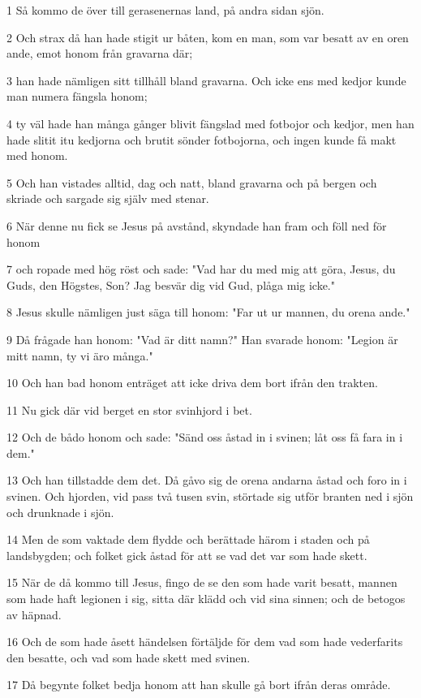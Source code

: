 \par 1 Så kommo de över till gerasenernas land, på andra sidan sjön.
\par 2 Och strax då han hade stigit ur båten, kom en man, som var besatt av en oren ande, emot honom från gravarna där;
\par 3 han hade nämligen sitt tillhåll bland gravarna. Och icke ens med kedjor kunde man numera fängsla honom;
\par 4 ty väl hade han många gånger blivit fängslad med fotbojor och kedjor, men han hade slitit itu kedjorna och brutit sönder fotbojorna, och ingen kunde få makt med honom.
\par 5 Och han vistades alltid, dag och natt, bland gravarna och på bergen och skriade och sargade sig själv med stenar.
\par 6 När denne nu fick se Jesus på avstånd, skyndade han fram och föll ned för honom
\par 7 och ropade med hög röst och sade: "Vad har du med mig att göra, Jesus, du Guds, den Högstes, Son? Jag besvär dig vid Gud, plåga mig icke."
\par 8 Jesus skulle nämligen just säga till honom: "Far ut ur mannen, du orena ande."
\par 9 Då frågade han honom: "Vad är ditt namn?" Han svarade honom: "Legion är mitt namn, ty vi äro många."
\par 10 Och han bad honom enträget att icke driva dem bort ifrån den trakten.
\par 11 Nu gick där vid berget en stor svinhjord i bet.
\par 12 Och de bådo honom och sade: "Sänd oss åstad in i svinen; låt oss få fara in i dem."
\par 13 Och han tillstadde dem det. Då gåvo sig de orena andarna åstad och foro in i svinen. Och hjorden, vid pass två tusen svin, störtade sig utför branten ned i sjön och drunknade i sjön.
\par 14 Men de som vaktade dem flydde och berättade härom i staden och på landsbygden; och folket gick åstad för att se vad det var som hade skett.
\par 15 När de då kommo till Jesus, fingo de se den som hade varit besatt, mannen som hade haft legionen i sig, sitta där klädd och vid sina sinnen; och de betogos av häpnad.
\par 16 Och de som hade åsett händelsen förtäljde för dem vad som hade vederfarits den besatte, och vad som hade skett med svinen.
\par 17 Då begynte folket bedja honom att han skulle gå bort ifrån deras område.

